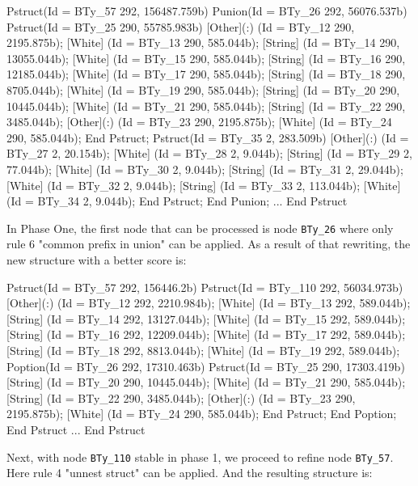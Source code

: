 \begin{code}
Pstruct(Id = BTy_57 292, 156487.759b)
  Punion(Id = BTy_26 292, 56076.537b)
    Pstruct(Id = BTy_25 290, 55785.983b)
      [Other](:) (Id = BTy_12 290, 2195.875b);
      [White] (Id = BTy_13 290, 585.044b);
      [String] (Id = BTy_14 290, 13055.044b);
      [White] (Id = BTy_15 290, 585.044b);
      [String] (Id = BTy_16 290, 12185.044b);
      [White] (Id = BTy_17 290, 585.044b);
      [String] (Id = BTy_18 290, 8705.044b);
      [White] (Id = BTy_19 290, 585.044b);
      [String] (Id = BTy_20 290, 10445.044b);
      [White] (Id = BTy_21 290, 585.044b);
      [String] (Id = BTy_22 290, 3485.044b);
      [Other](:) (Id = BTy_23 290, 2195.875b);
      [White] (Id = BTy_24 290, 585.044b);
    End Pstruct;
    Pstruct(Id = BTy_35 2, 283.509b)
    [Other](:) (Id = BTy_27 2, 20.154b);
      [White] (Id = BTy_28 2, 9.044b);
      [String] (Id = BTy_29 2, 77.044b);
      [White] (Id = BTy_30 2, 9.044b);
      [String] (Id = BTy_31 2, 29.044b);
      [White] (Id = BTy_32 2, 9.044b);
      [String] (Id = BTy_33 2, 113.044b);
      [White] (Id = BTy_34 2, 9.044b);
    End Pstruct;
  End Punion;
  ...
End Pstruct
\end{code}

In Phase One, the first node that can be processed is node {\tt BTy\_26}
where only rule 6 "common prefix in union" can be applied. As a result of that
rewriting, the new structure with a better score is:

\begin{code}
Pstruct(Id = BTy_57 292, 156446.2b)
  Pstruct(Id = BTy_110 292, 56034.973b)
    [Other](:) (Id = BTy_12 292, 2210.984b);
    [White] (Id = BTy_13 292, 589.044b);
    [String] (Id = BTy_14 292, 13127.044b);
    [White] (Id = BTy_15 292, 589.044b);
    [String] (Id = BTy_16 292, 12209.044b);
    [White] (Id = BTy_17 292, 589.044b);
    [String] (Id = BTy_18 292, 8813.044b);
    [White] (Id = BTy_19 292, 589.044b);
    Poption(Id = BTy_26 292, 17310.463b)
      Pstruct(Id = BTy_25 290, 17303.419b)
    	[String] (Id = BTy_20 290, 10445.044b);
    	[White] (Id = BTy_21 290, 585.044b);
    	[String] (Id = BTy_22 290, 3485.044b);
    	[Other](:) (Id = BTy_23 290, 2195.875b);
    	[White] (Id = BTy_24 290, 585.044b);
      End Pstruct;
    End Poption;
  End Pstruct
  ...
End Pstruct
\end{code}

Next, with node {\tt BTy\_110} stable in phase 1, we proceed to
refine node {\tt BTy\_57}. Here rule 4 "unnest struct" can be applied.
And the resulting structure is:

